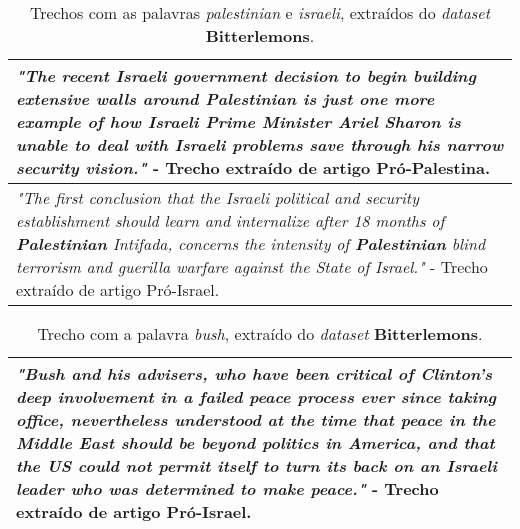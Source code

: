
\begin{table}[t]
\centering
\begin{tabular}{| p{10cm} | }
\hline

\emph{"The recent \textbf{Israeli} government decision to begin building extensive walls
around \textbf{Palestinian} is just one more example of how \textbf{Israeli} Prime
Minister Ariel Sharon is unable to deal with \textbf{Israeli} problems save
through his narrow security vision."} - Trecho extraído de artigo Pró-Palestina. \\ \hline

\emph{"The first conclusion that the Israeli political and security
establishment should learn and internalize after 18 months of
\textbf{Palestinian} Intifada, concerns the intensity of \textbf{Palestinian} blind
terrorism and guerilla warfare against the State of Israel."} - Trecho extraído de artigo Pró-Israel. \\ \hline

\end{tabular}
\label{3}
\caption{Trechos com as palavras \emph{palestinian} e \emph{israeli}, extraídos do \emph{dataset} \textbf{Bitterlemons}.}
\end{table}

\begin{table}[t]
\centering
\begin{tabular}{| p{10cm} | }
\hline

\emph{"\textbf{Bush}
and his advisers, who have been critical of Clinton's deep involvement
in a failed peace process ever since taking office, nevertheless
understood at the time that peace in the Middle East should be beyond
politics in America, and that the US could not permit itself to turn its
back on an Israeli leader who was determined to make peace."} - Trecho extraído de artigo Pró-Israel. \\ \hline

\end{tabular}
\label{4}
\caption{Trecho com a palavra \emph{bush}, extraído do \emph{dataset} \textbf{Bitterlemons}.}
\end{table}

